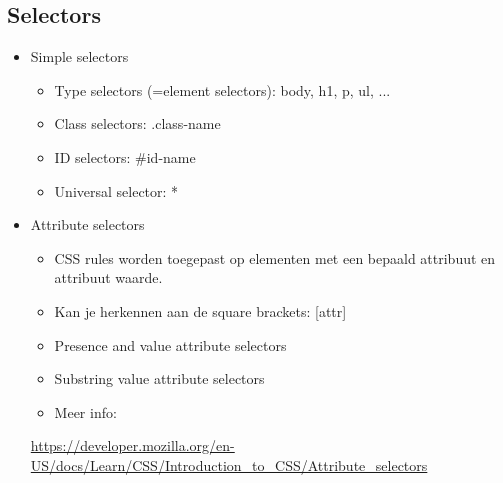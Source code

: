 \documentclass{article}
\begin{document}
\subsection{Selectors}
\begin{itemize}
    \item Simple selectors
    \begin{itemize}
        \item Type selectors (=element selectors): body, h1, p, ul, ...
        \item Class selectors: .class-name
        \item ID selectors: \#id-name
        \item Universal selector: *
    \end{itemize}
    \item Attribute selectors
    \begin{itemize}
        \item CSS rules worden toegepast op elementen met een bepaald attribuut en attribuut waarde. 
        \item Kan je herkennen aan de square brackets: [attr] 
        \item Presence and value attribute selectors 
        \item Substring value attribute selectors 
        \item Meer info: 
    \end{itemize}
    \url{https://developer.mozilla.org/en-US/docs/Learn/CSS/Introduction\_to\_CSS/Attribute\_selectors}


\end{itemize}
\end{document}
